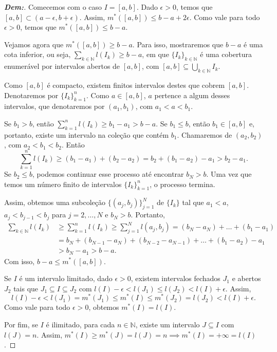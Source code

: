 \begin{proof}[\textbf{Dem:}]
Comecemos com o caso $I = [a,b]$. Dado $\epsilon > 0$, temos que $[a,b] \subset (a-\epsilon, b+\epsilon)$. Assim, $m^*([a,b]) \le b-a+2\epsilon$. Como vale para todo $\epsilon > 0$, temos que $m^*([a,b]) \le b-a$.

Vejamos agora que $m^*([a,b]) \ge b-a$. Para isso, mostraremos que $b-a$ é uma cota inferior, ou seja, $\sum_{k \in \mathbb{N}} l(I_k) \ge b-a$, em que $\{I_k\}_{k \in \mathbb{N}}$ é uma cobertura enumerável por intervalos abertos de $[a,b]$, com $[a,b] \subseteq \bigcup_{k \in \mathbb{N}} I_k$.

Como $[a,b]$ é compacto, existem finitos intervalos destes que cobrem $[a,b]$. Denotaremos por $\{I_k\}_{k=1}^n$. 
Como $a \in [a,b]$, $a$ pertence a algum desses intervalos, que denotaremos por $(a_1, b_1)$, com $a_1 < a < b_1$.

Se $b_1 > b$, então $\sum_{k=1}^n l(I_k) \ge b_1 - a_1 > b - a$.
Se $b_1 \le b$, então $b_1 \in [a,b]$ e, portanto, existe um intervalo na coleção que contém $b_1$. Chamaremos de $(a_2, b_2)$, com $a_2 < b_1 < b_2$. Então
$$ \sum_{k=1}^n l(I_k) \ge (b_1 - a_1) + (b_2 - a_2) = b_2 + (b_1 - a_2) - a_1 > b_2 - a_1. $$
Se $b_2 \le b$, podemos continuar esse processo até encontrar $b_N > b$. Uma vez que temos um número finito de intervalos $\{I_k\}_{k=1}^n$, o processo termina.

Assim, obtemos uma subcoleção $\{(a_j, b_j)\}_{j=1}^N$ de $\{I_k\}$ tal que $a_1 < a$, $a_j < b_{j-1} < b_j$ para $j=2, \dots, N$ e $b_N > b$.
Portanto,
\begin{align*}
    \sum_{k \in \mathbb{N}} l(I_k) &\ge \sum_{k=1}^n l(I_k) \ge \sum_{j=1}^N l(a_j, b_j) = (b_N - a_N) + \dots + (b_1 - a_1) \\
    &= b_N + (b_{N-1} - a_N) + (b_{N-2} - a_{N-1}) + \dots + (b_1 - a_2) - a_1 \\
    &> b_N - a_1 > b - a.
\end{align*}
Com isso, $b-a \le m^*([a,b])$.

Se $I$ é um intervalo limitado, dado $\epsilon > 0$, existem intervalos fechados $J_1$ e abertos $J_2$ tais que $J_1 \subseteq I \subseteq J_2$ com $l(I) - \epsilon < l(J_1) \le l(J_2) < l(I) + \epsilon$.
Assim,
$$ l(I) - \epsilon < l(J_1) = m^*(J_1) \le m^*(I) \le m^*(J_2) = l(J_2) < l(I) + \epsilon. $$
Como vale para todo $\epsilon > 0$, obtemos $m^*(I) = l(I)$.

Por fim, se $I$ é ilimitado, para cada $n \in \mathbb{N}$, existe um intervalo $J \subseteq I$ com $l(J) = n$. Assim, $m^*(I) \ge m^*(J) = l(J) = n \implies m^*(I) = +\infty = l(I)$.
\end{proof}

